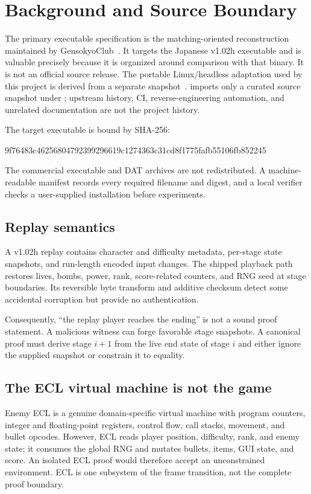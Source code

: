 \section{Background and Source Boundary}

The primary executable specification is the matching-oriented reconstruction
maintained by GensokyoClub~\cite{gensokyoclub-th06}.  It targets the Japanese
v1.02h executable and is valuable precisely because it is organized around
comparison with that binary.  It is not an official source release.  The
portable Linux/headless adaptation used by this project is derived from a
separate snapshot~\cite{n0zom1z0-headless}.  \project{} imports only a curated
source snapshot under ; upstream history, CI, reverse-engineering
automation, and unrelated documentation are not the project history.

The target executable is bound by SHA-256:
\begin{center}
\small\ttfamily
9f76483c46256804792399296619c1274363c31cd8f1775fafb55106fb852245
\end{center}
The commercial executable and DAT archives are not redistributed.  A
machine-readable manifest records every required filename and digest, and a
local verifier checks a user-supplied installation before experiments.

\subsection{Replay semantics}

A v1.02h replay contains character and difficulty metadata, per-stage state
snapshots, and run-length encoded input changes.  The shipped playback path
restores lives, bombs, power, rank, score-related counters, and RNG seed at stage
boundaries.  Its reversible byte transform and additive checksum detect some
accidental corruption but provide no authentication.

Consequently, ``the replay player reaches the ending'' is not a sound proof
statement.  A malicious witness can forge favorable stage snapshots.  A
canonical proof must derive stage $i+1$ from the live end state of stage $i$ and
either ignore the supplied snapshot or constrain it to equality.

\subsection{The ECL virtual machine is not the game}

Enemy ECL is a genuine domain-specific virtual machine with program counters,
integer and floating-point registers, control flow, call stacks, movement, and
bullet opcodes.  However, ECL reads player position, difficulty, rank, and enemy
state; it consumes the global RNG and mutates bullets, items, GUI state, and
score.  An isolated ECL proof would therefore accept an unconstrained
environment.  ECL is one subsystem of the frame transition, not the complete
proof boundary.
